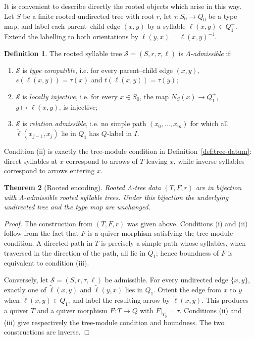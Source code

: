\documentclass[11pt,a4paper]{amsart}
\theoremstyle{definition}
\newtheorem{definition}{Definition}[section]
\theoremstyle{plain}
\newtheorem{theorem}[definition]{Theorem}
\theoremstyle{remark}
\numberwithin{equation}{section}
\begin{document}
It is convenient to describe directly the rooted objects which arise in this way. Let $S$ be a finite rooted undirected tree with root $r$, let $\tau:S_0\to Q_0$ be a type map, and label each parent--child edge $(x,y)$ by a syllable $\ell(x,y)\in Q_1^{\pm}$. Extend the labelling to both orientations by $\widetilde\ell(y,x)=\widetilde\ell(x,y)^{-1}$.

\begin{definition}\label{def:admissible-syllable-tree}
The rooted syllable tree $\mathcal S=(S,r,\tau,\ell)$ is \emph{$\Lambda$-admissible} if:
\begin{enumerate}[label=\textup{(\roman*)}]
\item $\mathcal S$ is \emph{type compatible}, i.e. for every parent--child edge $(x,y)$, $s(\ell(x,y))=\tau(x)$ and $t(\ell(x,y))=\tau(y)$;
\item $\mathcal S$ is \emph{locally injective}, i.e. for every $x\in S_0$, the map $N_S(x)\to Q_1^{\pm}$, $y\mapsto\widetilde\ell(x,y)$, is injective;
\item $\mathcal S$ is  \emph{relation admissible}, i.e. no simple path $(x_0,\ldots,x_m)$ for which all $\widetilde\ell(x_{j-1},x_j)$ lie in $Q_1$ has $Q$-label in $I$.
\end{enumerate}
\end{definition}

Condition (ii) is exactly the tree-module condition in Definition~\ref{def:tree-datum}: direct syllables at $x$ correspond to arrows of $T$ leaving $x$, while inverse syllables correspond to arrows entering $x$.

\begin{theorem}[Rooted encoding]\label{thm:rooted-encoding}
Rooted $\Lambda$-tree data $(T,F,r)$ are in bijection with $\Lambda$-admissible rooted syllable trees. Under this bijection the underlying undirected tree and the type map are unchanged.
\end{theorem}

\begin{proof}
The construction from $(T,F,r)$ was given above. Conditions (i) and (ii) follow from the fact that $F$ is a quiver morphism satisfying the tree-module condition. A directed path in $T$ is precisely a simple path whose syllables, when traversed in the direction of the path, all lie in $Q_1$; hence boundness of $F$ is equivalent to condition (iii).

Conversely, let $\mathcal S=(S,r,\tau,\ell)$ be admissible. For every undirected edge $\{x,y\}$, exactly one of $\widetilde\ell(x,y)$ and $\widetilde\ell(y,x)$ lies in $Q_1$. Orient the edge from $x$ to $y$ when $\widetilde\ell(x,y)\in Q_1$, and label the resulting arrow by $\widetilde\ell(x,y)$. This produces a quiver $T$ and a quiver morphism $F:T\to Q$ with $F|_{T_0}=\tau$. Conditions (ii) and (iii) give respectively the tree-module condition and boundness. The two constructions are inverse.
\end{proof}
\end{document}
